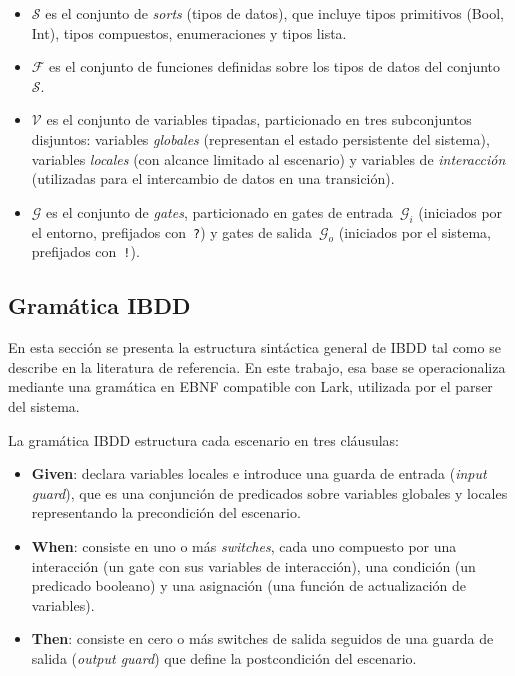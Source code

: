 \begin{itemize}
  \item $\mathcal{S}$ es el conjunto de \textit{sorts} (tipos de datos), que incluye tipos primitivos (Bool, Int), tipos compuestos, enumeraciones y tipos lista.
  \item $\mathcal{F}$ es el conjunto de funciones definidas sobre los tipos de datos del conjunto $\mathcal{S}$.
  \item $\mathcal{V}$ es el conjunto de variables tipadas, particionado en tres subconjuntos disjuntos: variables \textit{globales} (representan el estado persistente del sistema), variables \textit{locales} (con alcance limitado al escenario) y variables de \textit{interacción} (utilizadas para el intercambio de datos en una transición).
  \item $\mathcal{G}$ es el conjunto de \textit{gates}, particionado en gates de entrada~$\mathcal{G}_i$ (iniciados por el entorno, prefijados con~\texttt{?}) y gates de salida~$\mathcal{G}_o$ (iniciados por el sistema, prefijados con~\texttt{!}).
\end{itemize}

\subsection{Gramática IBDD}

En esta sección se presenta la estructura sintáctica general de IBDD tal como se describe en la literatura de referencia. En este trabajo, esa base se operacionaliza mediante una gramática en EBNF compatible con Lark, utilizada por el parser del sistema.

La gramática IBDD estructura cada escenario en tres cláusulas:

\begin{itemize}
  \item \textbf{Given}: declara variables locales e introduce una guarda de entrada (\textit{input guard}), que es una conjunción de predicados sobre variables globales y locales representando la precondición del escenario.
  \item \textbf{When}: consiste en uno o más \textit{switches}, cada uno compuesto por una interacción (un gate con sus variables de interacción), una condición (un predicado booleano) y una asignación (una función de actualización de variables).
  \item \textbf{Then}: consiste en cero o más switches de salida seguidos de una guarda de salida (\textit{output guard}) que define la postcondición del escenario.
\end{itemize}

